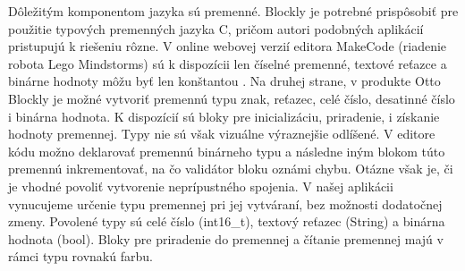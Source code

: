 Dôležitým komponentom jazyka sú premenné. Blockly je potrebné prispôsobiť pre použitie typových premenných jazyka C, pričom autori podobných aplikácií pristupujú k riešeniu rôzne. V online webovej verzií editora MakeCode (riadenie robota Lego Mindstorms) sú k dispozícii len číselné premenné, textové reťazce a binárne hodnoty môžu byť len konštantou \cite{makeCodeWebEditor}. Na druhej strane, v produkte Otto Blockly je možné vytvoriť premennú typu znak, reťazec, celé číslo, desatinné číslo i binárna hodnota. K dispozícií sú bloky pre inicializáciu, priradenie, i získanie hodnoty premennej. Typy nie sú však vizuálne výraznejšie odlíšené. V editore kódu možno deklarovať premennú binárneho typu a následne iným blokom túto premennú inkrementovať, na čo validátor bloku oznámi chybu. Otázne však je, či je vhodné povoliť vytvorenie neprípustného spojenia. V našej aplikácii vynucujeme určenie typu premennej pri jej vytváraní, bez možnosti dodatočnej zmeny. Povolené typy sú celé číslo (int16\_t), textový reťazec (String) a binárna hodnota (bool). Bloky pre priradenie do premennej a čítanie premennej majú v rámci typu rovnakú farbu.